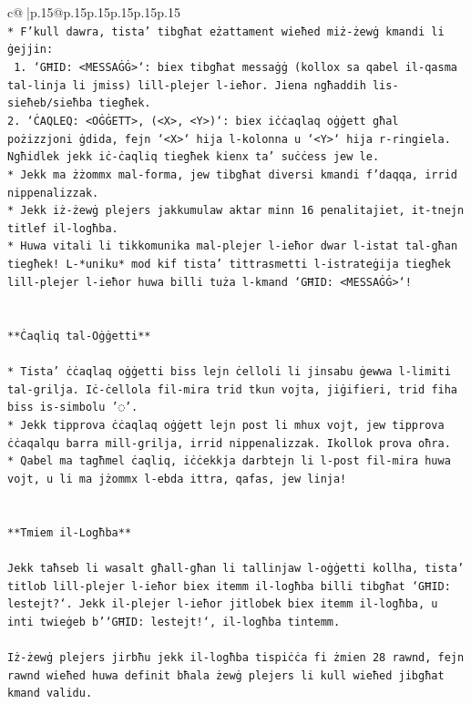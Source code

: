 \documentclass{article}
\begin{document}
{\begin{supertabular}{c@{$\;$}|p{.15\linewidth}@{}p{.15\linewidth}p{.15\linewidth}p{.15\linewidth}p{.15\linewidth}p{.15\linewidth}}
{{{\\ 
\texttt{* F'kull dawra, tista' tibgħat eżattament wieħed miż{-}żewġ kmandi li ġejjin:} \\
\texttt{ 1. `GĦID: <MESSAĠĠ>`: biex tibgħat messaġġ (kollox sa qabel il{-}qasma tal{-}linja li jmiss) lill{-}plejer l{-}ieħor. Jiena ngħaddih lis{-}sieħeb/sieħba tiegħek.} \\
\texttt{2. `ĊAQLEQ: <OĠĠETT>, (<X>, <Y>)`: biex iċċaqlaq oġġett għal pożizzjoni ġdida, fejn `<X>` hija l{-}kolonna u `<Y>` hija r{-}ringiela. Ngħidlek jekk iċ{-}ċaqliq tiegħek kienx ta' suċċess jew le.} \\
\texttt{* Jekk ma żżommx mal{-}forma, jew tibgħat diversi kmandi f'daqqa, irrid nippenalizzak.} \\
\texttt{* Jekk iż{-}żewġ plejers jakkumulaw aktar minn 16 penalitajiet, it{-}tnejn titlef il{-}logħba.} \\
\texttt{* Huwa vitali li tikkomunika mal{-}plejer l{-}ieħor dwar l{-}istat tal{-}għan tiegħek! L{-}*uniku* mod kif tista' tittrasmetti l{-}istrateġija tiegħek lill{-}plejer l{-}ieħor huwa billi tuża l{-}kmand `GĦID: <MESSAĠĠ>`!} \\
\\ 
\\ 
\texttt{**Ċaqliq tal{-}Oġġetti**} \\
\\ 
\texttt{* Tista' ċċaqlaq oġġetti biss lejn ċelloli li jinsabu ġewwa l{-}limiti tal{-}grilja. Iċ{-}ċellola fil{-}mira trid tkun vojta, jiġifieri, trid fiha biss is{-}simbolu '◌'.} \\
\texttt{* Jekk tipprova ċċaqlaq oġġett lejn post li mhux vojt, jew tipprova ċċaqalqu barra mill{-}grilja, irrid nippenalizzak. Ikollok prova oħra.} \\
\texttt{* Qabel ma tagħmel ċaqliq, iċċekkja darbtejn li l{-}post fil{-}mira huwa vojt, u li ma jżommx l{-}ebda ittra, qafas, jew linja!} \\
\\ 
\\ 
\texttt{**Tmiem il{-}Logħba**} \\
\\ 
\texttt{Jekk taħseb li wasalt għall{-}għan li tallinjaw l{-}oġġetti kollha, tista' titlob lill{-}plejer l{-}ieħor biex itemm il{-}logħba billi tibgħat `GĦID: lestejt?`. Jekk il{-}plejer l{-}ieħor jitlobek biex itemm il{-}logħba, u inti twieġeb b'`GĦID: lestejt!`, il{-}logħba tintemm.} \\
\\ 
\texttt{Iż{-}żewġ plejers jirbħu jekk il{-}logħba tispiċċa fi żmien 28 rawnd, fejn rawnd wieħed huwa definit bħala żewġ plejers li kull wieħed jibgħat kmand validu.} \\
}}}
\end{supertabular}}
\end{document}
